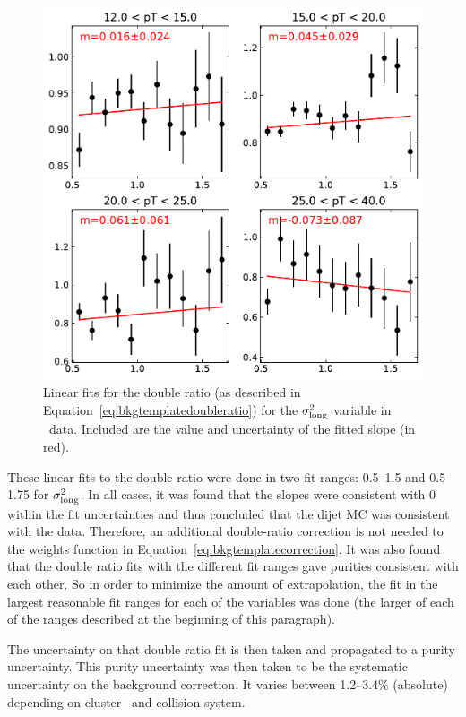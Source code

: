 \begin{figure}[htpb]
    \centering
    \includegraphics[width=\textwidth]{Data_Analysis/Purity/single-linear-fits-p-Pb}
    \caption{Linear fits for the double ratio (as described in Equation~\ref{eq:bkgtemplatedoubleratio}) for the $\sigma^{2}_{\mathrm{long}}$ variable in \pPb~data.  Included are the value and uncertainty of the fitted slope (in red).}
    \label{fig:bkgtemplatedoubleratiofits_pPb}
\end{figure}

These linear fits to the double ratio were done in two fit ranges: 0.5--1.5 and 0.5--1.75 for $\sigma^{2}_{\mathrm{long}}$. In all cases, it was found that the slopes were consistent with 0 within the fit uncertainties and thus concluded that the dijet MC was consistent with the data. Therefore, an additional double-ratio correction is not needed to the weights function in Equation~\ref{eq:bkgtemplatecorrection}. It was also found that the double ratio fits with the different fit ranges gave purities consistent with each other. So in order to minimize the amount of extrapolation, the fit in the largest reasonable fit ranges for each of the variables was done (the larger of each of the ranges described at the beginning of this paragraph). 

The uncertainty on that double ratio fit is then taken and propagated to a purity uncertainty. This purity uncertainty was then taken to be the systematic uncertainty on the background correction. It varies between 1.2--3.4\% (absolute) depending on cluster \pt~and collision system.



